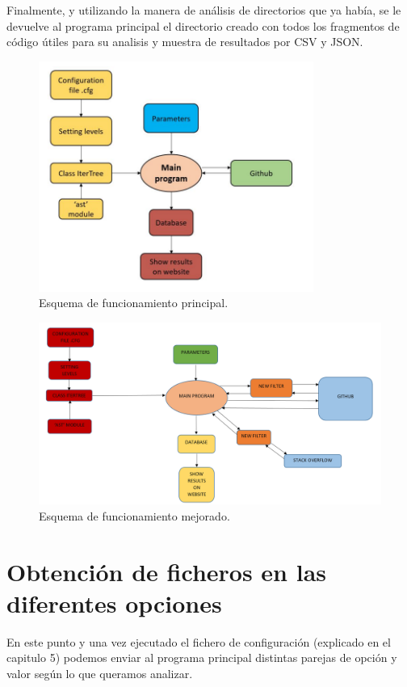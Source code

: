 \documentclass[a4paper, 12pt]{book}
\begin{document}
Finalmente, y utilizando la manera de análisis de directorios que ya había, se le devuelve al programa principal el directorio creado con todos los fragmentos de código útiles para su analisis y muestra de resultados por CSV y JSON.

\begin{figure}
  \centering
  \includegraphics[width=9cm, keepaspectratio]{img/figura_funcionamiento_1.png}
  \caption{Esquema de funcionamiento principal.}\label{fig:arquitectura}
\end{figure}

\begin{figure}
    \centering
    \includegraphics[bb=0 0 800 600, width=12cm, keepaspectratio]{img/figura_funcionamiento_2}
    \caption{Esquema de funcionamiento mejorado.}\label{fig:_arquitectura}
\end{figure}

\section{Obtención de ficheros en las diferentes opciones} 
\label{sec:Obtención de ficheros en las diferentes opciones}

En este punto y una vez ejecutado el fichero de configuración (explicado en el capitulo 5) podemos enviar al programa principal distintas parejas de opción y valor según lo que queramos analizar.
\end{document}
